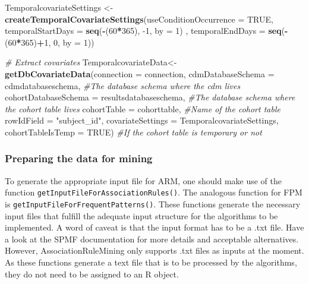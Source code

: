 \documentclass[
]{article}
\newenvironment{Shaded}{\begin{snugshade}}{\end{snugshade}}
\newcommand{\CommentTok}[1]{\textcolor[rgb]{0.56,0.35,0.01}{\textit{#1}}}
\newcommand{\DataTypeTok}[1]{\textcolor[rgb]{0.13,0.29,0.53}{#1}}
\newcommand{\DecValTok}[1]{\textcolor[rgb]{0.00,0.00,0.81}{#1}}
\newcommand{\KeywordTok}[1]{\textcolor[rgb]{0.13,0.29,0.53}{\textbf{#1}}}
\newcommand{\NormalTok}[1]{#1}
\newcommand{\OperatorTok}[1]{\textcolor[rgb]{0.81,0.36,0.00}{\textbf{#1}}}
\newcommand{\OtherTok}[1]{\textcolor[rgb]{0.56,0.35,0.01}{#1}}
\newcommand{\StringTok}[1]{\textcolor[rgb]{0.31,0.60,0.02}{#1}}
\begin{document}
\begin{Shaded}
\begin{Highlighting}[]
\NormalTok{TemporalcovariateSettings <-}\StringTok{ }\KeywordTok{createTemporalCovariateSettings}\NormalTok{(}\DataTypeTok{useConditionOccurrence =} \OtherTok{TRUE}\NormalTok{,}
                                                      \DataTypeTok{temporalStartDays =} \KeywordTok{seq}\NormalTok{(}\OperatorTok{-}\NormalTok{(}\DecValTok{60}\OperatorTok{*}\DecValTok{365}\NormalTok{), }\DecValTok{-1}\NormalTok{, }\DataTypeTok{by =} \DecValTok{1}\NormalTok{) ,}
                                                      \DataTypeTok{temporalEndDays =} \KeywordTok{seq}\NormalTok{(}\OperatorTok{-}\NormalTok{(}\DecValTok{60}\OperatorTok{*}\DecValTok{365}\NormalTok{)}\OperatorTok{+}\DecValTok{1}\NormalTok{, }\DecValTok{0}\NormalTok{, }\DataTypeTok{by =} \DecValTok{1}\NormalTok{))}

\CommentTok{# Extract covariates}
\NormalTok{TemporalcovariateData<-}\StringTok{ }\KeywordTok{getDbCovariateData}\NormalTok{(}\DataTypeTok{connection =}\NormalTok{ connection, }
                                           \DataTypeTok{cdmDatabaseSchema =}\NormalTok{ cdmdatabaseschema, }\CommentTok{#The database schema where the cdm lives}
                                           \DataTypeTok{cohortDatabaseSchema =}\NormalTok{ resultsdatabaseschema, }\CommentTok{#The database schema where the cohort table lives}
                                           \DataTypeTok{cohortTable =}\NormalTok{ cohorttable, }\CommentTok{#Name of the cohort table}
                                           \DataTypeTok{rowIdField =} \StringTok{"subject_id"}\NormalTok{, }
                                           \DataTypeTok{covariateSettings =}\NormalTok{ TemporalcovariateSettings, }
                                           \DataTypeTok{cohortTableIsTemp =} \OtherTok{TRUE}\NormalTok{) }\CommentTok{#If the cohort table is temporary or not}
\end{Highlighting}
\end{Shaded}

\hypertarget{preparing-the-data-for-mining}{%
\subsubsection{Preparing the data for
mining}\label{preparing-the-data-for-mining}}

To generate the appropriate input file for ARM, one should make use of
the function \texttt{getInputFileForAssociationRules()}. The analogous
function for FPM is \texttt{getInputFileForFrequentPatterns()}. These
functions generate the necessary input files that fulfill the adequate
input structure for the algorithms to be implemented. A word of caveat
is that the input format has to be a .txt file. Have a look at the SPMF
documentation for more details and acceptable alternatives. However,
AssociationRuleMining only supports .txt files as inputs at the moment.
As these functions generate a text file that is to be processed by the
algorithms, they do not need to be assigned to an R object.
\end{document}
